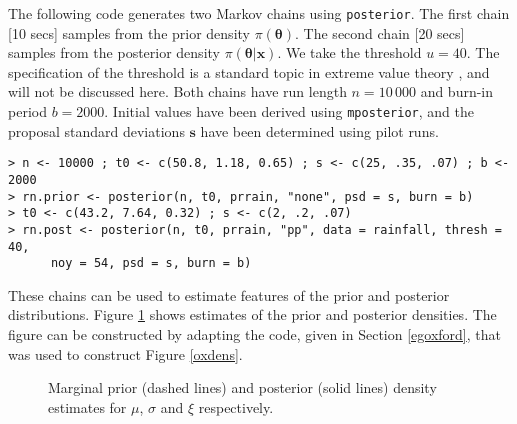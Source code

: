 \documentclass[11pt,a4paper]{article}
\newcommand{\bs}{\boldsymbol}
\begin{document}
The following code generates two Markov chains using \verb+posterior+.
The first chain [10 secs] samples from the prior density
$\pi(\bs{\theta})$.  The second chain [20 secs] samples from the
posterior density $\pi(\bs{\theta}|\bs{x})$.  We take the threshold
$u=40$.  The specification of the threshold is a standard topic in
extreme value theory \citep[e.g.][Ch 4]{cole01}, and will not be
discussed here.  Both chains have run length $n=10\,000$ and burn-in
period $b=2000$.  Initial values have been derived using
\verb+mposterior+, and the proposal standard deviations $\bs{s}$ have
been determined using pilot runs.

\begin{verbatim}
> n <- 10000 ; t0 <- c(50.8, 1.18, 0.65) ; s <- c(25, .35, .07) ; b <- 2000
> rn.prior <- posterior(n, t0, prrain, "none", psd = s, burn = b)
> t0 <- c(43.2, 7.64, 0.32) ; s <- c(2, .2, .07)
> rn.post <- posterior(n, t0, prrain, "pp", data = rainfall, thresh = 40, 
      noy = 54, psd = s, burn = b)
\end{verbatim}

These chains can be used to estimate features of the prior and
posterior distributions.  Figure \ref{rainpp} shows estimates of the
prior and posterior densities.  The figure can be constructed by
adapting the code, given in Section \ref{egoxford}, that was used to
construct Figure \ref{oxdens}.


\begin{figure}
\begin{center}
   \vspace{-1.5cm}
  \hspace{0cm} 
  \hspace{0cm} 
\end{center}
\caption{Marginal prior (dashed lines) and posterior (solid lines)
  density estimates for $\mu$, $\sigma$ and $\xi$ respectively.}
\label{rainpp}
\end{figure}
\end{document}
